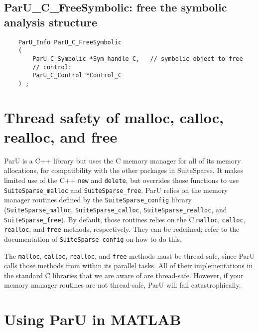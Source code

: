 \documentclass[12pt]{article}
\begin{document}
\subsection{{\sf ParU\_C\_FreeSymbolic}: free the symbolic analysis structure}

    {\footnotesize
    \begin{verbatim}
    ParU_Info ParU_C_FreeSymbolic
    (
        ParU_C_Symbolic *Sym_handle_C,   // symbolic object to free
        // control:
        ParU_C_Control *Control_C
    ) ; \end{verbatim} }

\section{Thread safety of {\sf malloc}, {\sf calloc}, {\sf realloc}, and
{\sf free}}

ParU is a C++ library but uses the C memory manager for all of its memory
allocations, for compatibility with the other packages in SuiteSparse.  It
makes limited use of the C++ \verb'new' and \verb'delete', but overrides those
functions to use \verb'SuiteSparse_malloc' and \verb'SuiteSparse_free'.  ParU
relies on the memory manager routines defined by the \verb'SuiteSparse_config'
library (\verb'SuiteSparse_malloc', \verb'SuiteSparse_calloc',
\verb'SuiteSparse_realloc', and \verb'SuiteSparse_free').  By default, those
routines relies on the C \verb'malloc', \verb'calloc', \verb'realloc', and
\verb'free' methods, respectively.  They can be redefined; refer to the
documentation of \verb'SuiteSparse_config' on how to do this.

The \verb'malloc', \verb'calloc', \verb'realloc', and \verb'free' methods must
be thread-safe, since ParU calls those methods from within its parallel tasks.
All of their implementations in the standard C libraries that we are aware of
are thread-safe.  However, if your memory manager routines are not thread-safe,
ParU will fail catastrophically.

\section{Using ParU in MATLAB}
\end{document}
